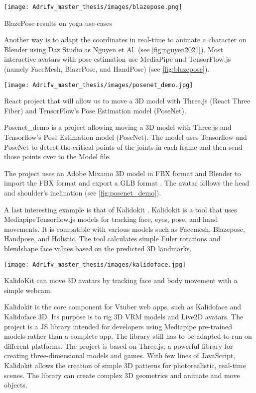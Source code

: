 \begin{marginfigure}
    \centering
    \texttt{[image: AdrLfv\_master\_thesis/images/blazepose.png]}
    \caption{BlazePose results on yoga use-cases}
    \label{fig:blazepose}
\end{marginfigure}

Another way is to adapt the coordinates in real-time to animate a character on Blender using Daz Studio as Nguyen et Al. \cite{nguyen2021automatic} (see \ref{fig:nguyen2021}). Most interactive avatars with pose estimation use MediaPipe and TensorFlow.js (namely FaceMesh, BlazePose, and HandPose) \cite{blazepose} (see \ref{fig:blazepose}).

\begin{marginfigure}
    \centering
    \texttt{[image: AdrLfv\_master\_thesis/images/posenet\_demo.jpg]}
    \caption{React project that will allow us to move a 3D model with Three.js (React Three Fiber) and TensorFlow's Pose Estimation model (PoseNet).}
    \label{fig:posenet_demo}
\end{marginfigure}

Posenet\_demo \cite{posenet_demo} is a project allowing moving a 3D model with Three.js and Tensorflow's Pose Estimation model (PoseNet). The model uses Tensorflow and PoseNet to detect the critical points of the joints in each frame and then send those points over to the Model file. 

The project uses an Adobe Mixamo \cite{mixamo} 3D model in FBX format and Blender to import the FBX format and export a GLB format \cite{posenet}. The avatar follows the head and shoulder's inclination (see \ref{fig:posenet_demo}).

A last interesting example is that of Kalidokit \cite{kalidokit}. Kalidokit is a tool that uses Mediapipe\/Tensorflow.js models for tracking face, eyes, pose, and hand movements.
It is compatible with various models such as Facemesh, Blazepose, Handpose, and Holistic. The tool calculates simple Euler rotations and blendshape face values based on the predicted 3D landmarks.

\begin{marginfigure}
    \centering
    \texttt{[image: AdrLfv\_master\_thesis/images/kalidoface.jpg]}
    \caption{KalidoKit can move 3D avatars by tracking face and body movement with a simple webcam.}
    \label{fig:kalidoface}
\end{marginfigure}

Kalidokit is the core component for Vtuber web apps, such as Kalidoface and Kalidoface 3D. Its purpose is to rig 3D VRM models and Live2D avatars. The project is a JS library intended for developers using Mediapipe pre-trained models rather than a complete app. The library still has to be adapted to run on different platforms. The project is based on Three.js, a powerful library for creating three-dimensional models and games. 
With few lines of JavaScript, Kalidokit allows the creation of simple 3D patterns for photorealistic, real-time scenes. The library can create complex 3D geometrics and animate and move objects.

